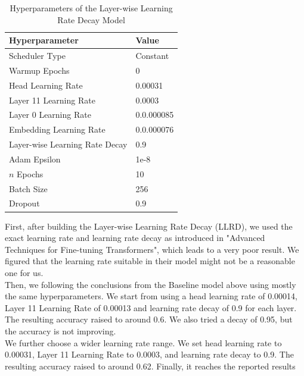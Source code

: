 \documentclass{article}
\begin{document}
    \begin{table}[H]
        \centering
        \begin{tabular}{ll}
            \toprule
            \textbf{Hyperparameter} & \textbf{Value} \\
            \midrule
            Scheduler Type          & Constant       \\
            Warmup Epochs           & 0              \\
            Head Learning Rate      & 0.00031         \\
            Layer 11 Learning Rate  & 0.0003         \\
            Layer 0 Learning Rate  & 0.0.000085         \\
            Embedding Learning Rate  & 0.0.000076        \\
            Layer-wise Learning Rate Decay  & 0.9    \\
            Adam Epsilon            & 1e-8           \\
            $n$ Epochs              & 10             \\
            Batch Size              & 256            \\
            Dropout                 & 0.9            \\
            \bottomrule
        \end{tabular}
        \caption{Hyperparameters of the Layer-wise Learning Rate Decay Model}
        \label{tab:hyps_LLRD}
    \end{table}
    First, after building the Layer-wise Learning Rate Decay (LLRD), we used the exact learning rate and learning rate decay as introduced in "Advanced Techniques for Fine-tuning Transformers", which leads to a very poor result. We figured that the learning rate suitable in their model might not be a reasonable one for us.\\
    Then, we following the conclusions from the Baseline model above using mostly the same hyperparameters. We start from using a head learning rate of 0.00014, Layer 11 Learning Rate of 0.00013 and learning rate decay of 0.9 for each layer. The resulting accuracy raised to around 0.6. We also tried a decay of 0.95, but the accuracy is not improving. \\
    We further choose a wider learning rate range. We set head learning rate to 0.00031, Layer 11 Learning Rate to 0.0003, and learning rate decay to 0.9. The resulting accuracy raised to around 0.62. Finally, it reaches the reported results\\
\end{document}

